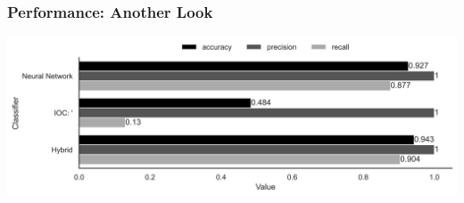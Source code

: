 \begin{frame}
\frametitle{Performance: Another Look}
\includegraphics[width=\textwidth]{res/generalizeability-performance.png}
\end{frame}

